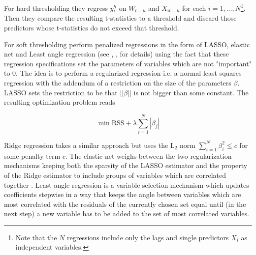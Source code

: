 \documentclass[12pt]{article}
\begin{document}
For hard thresholding they regress $y_t^h$ on $W_{t-h}$ and $X_{it-h}$ for each $i=1, ..., N$\footnote{Note that the $N$ regressions include only the lags and single predictors $X_i$ as independent variables.}. Then they compare the resulting t-statistics to a threshold and discard those predictors whose t-statistics do not exceed that threshold. 

For soft thresholding \citet{bai2008forecasting} perform penalized regressions in the form of LASSO, elastic net and Least angle regression (see \citet{tibshirani1996}, \citet{zou_hastie2005}, \citet{efron_hastie_johnstone_tibshirani2004} for details) using the fact that these regression specifications set the parameters of variables which are not "important" to $0$. 
The idea is to perform a regularized regression i.e. a normal least squares regression with the addendum of a restriction on the size of the parameters $\beta$. LASSO sets the restriction to be that $||\beta||$ is not bigger than some constant. The resulting optimization problem reads

$$\min \text{RSS} + \lambda \sum_{i=1}^N |\beta_j|$$

Ridge regression takes a similar approach but uses the L$_2$ norm $\sum_{i=1}^N \beta_i^2 \leq c$ for some penalty term $c$. The elastic net weighs between the two regularization mechanisms keeping both the sparsity of the LASSO estimator and the property of the Ridge estimator to include groups of variables which are correlated together \citet{zou_hastie2005}. Least angle regression is a variable selection mechanism which updates coefficients stepwise in a way that keeps the angle between variables which are most correlated with the residuals of the currently chosen set equal until (in the next step) a new variable has to be added to the set of most correlated variables.
\end{document}
